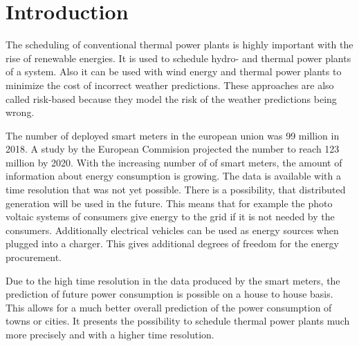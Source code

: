 \chapter{Introduction}

The scheduling of conventional thermal power plants is highly important
with the rise of renewable energies.
It is used to schedule hydro- and thermal power plants of a system.
\cite{Banos2011}
Also it can be used with wind energy and thermal power plants
to minimize the cost of incorrect weather predictions.
These approaches are also called risk-based
because they model the risk of the weather predictions being wrong.
\cite{Chen2008,Abujarad2017}

The number of deployed smart meters in the european union was 99 million in 2018.
A study by the European Commision projected the number to reach 123 million by 2020.
\cite{Vlachogiannis2019}
With the increasing number of of smart meters,
the amount of information about energy consumption is growing.
The data is available with a time resolution that was not yet possible.
There is a possibility, that distributed generation will be used in the future.
This means that for example the photo voltaic systems of consumers
give energy to the grid if it is not needed by the consumers.
Additionally electrical vehicles can be used as energy sources when plugged into a charger.
This gives additional degrees of freedom for the energy procurement.
\cite{Aiello2016,Zhang2016}

Due to the high time resolution in the data produced by the smart meters,
the prediction of future power consumption is possible on a house to house basis.
This allows for a much better overall prediction of the power consumption of towns or cities.
\cite{Basu2013}
It presents the possibility to schedule thermal power plants much more precisely
and with a higher time resolution.


